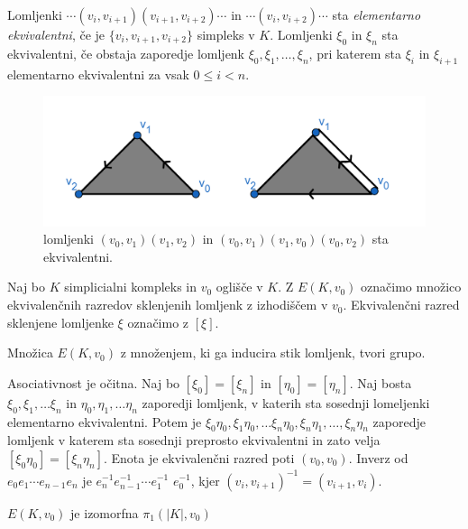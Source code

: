 \documentclass[mat1]{fmfdelo}
\begin{document}
Lomljenki $\cdots(v_i,v_{i+1})(v_{i+1},v_{i+2})\cdots$ in $\cdots(v_i,v_{i+2})\cdots$ sta \emph{elementarno ekvivalentni}, če je $\{v_i,v_{i+1},v_{i+2}\}$ simpleks v $K$. Lomljenki $\xi_0$ in $\xi_n$ sta ekvivalentni, če obstaja zaporedje lomljenk $\xi_0,\xi_1,\ldots,\xi_n$, pri katerem sta $\xi_i$ in $\xi_{i+1}$ elementarno ekvivalentni za vsak $0\leq i < n$.


\begin{figure}[h]
    \centering
    \includegraphics[width=0.9\linewidth]{lomljenki2.png}
    \caption{lomljenki $(v_0,v_1)(v_1,v_2)$ in $(v_0,v_1)(v_1,v_0)(v_0,v_2)$ sta ekvivalentni.}
\end{figure}

    Naj bo $K$ simplicialni kompleks in $v_0$ oglišče v $K$. Z $E(K,v_0)$ označimo množico ekvivalenčnih razredov sklenjenih lomljenk z izhodiščem v $v_0$. Ekvivalenčni razred sklenjene lomljenke $\xi$ označimo z $[\xi]$.

    \begin{trditev}
        Množica $E(K,v_0)$ z množenjem, ki ga inducira stik lomljenk, tvori grupo.
    \end{trditev}
\begin{dokaz}
    Asociativnost je očitna. Naj bo $[\xi_0]=[\xi_n]$ in $[\eta_0]=[\eta_n]$. Naj bosta $\xi_0,\xi_1,\ldots \xi_n$ in $\eta_0,\eta_1,\ldots \eta_n$ zaporedji lomljenk, v katerih sta sosednji lomeljenki elementarno ekvivalentni. Potem je $\xi_0\eta_0,\xi_1\eta_0,\ldots \xi_n\eta_0,\xi_n\eta_1,\ldots, \xi_n\eta_n$ zaporedje lomljenk v katerem sta sosednji preprosto ekvivalentni in zato velja $[\xi_0\eta_0]=[\xi_n\eta_n]$.
        Enota je ekvivalenčni razred poti $(v_0,v_0)$. Inverz 
    od $e_0e_1 \cdots e_{n-1}e_n$ je $e^{-1}_n e^{-1}_{n-1} \cdots e^{-1}_1$ $e^{-1}_0$, kjer $(v_i,v_{i+1})^{-1}=(v_{i+1},v_i)$.
\end{dokaz}

\begin{izrek}
    $E(K,v_0)$ je izomorfna $\pi_1(|K|,v_0)$
    \label{iz:grupa lomljenk}
\end{izrek}
\end{document}
